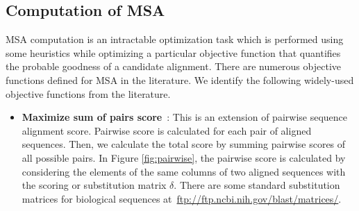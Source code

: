 

\subsection{Computation of MSA}
MSA computation is an intractable optimization task which is performed using some heuristics while optimizing a particular objective function that quantifies the probable goodness of a candidate alignment. There are numerous objective functions defined for MSA in the literature. We identify the following widely-used objective functions from the literature.

\begin{itemize}
	
	\item \textbf{Maximize sum of pairs score}~\cite{seeluangsawat2005multiple, da2010alineaga}:  
	This is an extension of pairwise sequence alignment score. Pairwise score is calculated for each pair of aligned sequences. Then, we calculate the total score by summing pairwise scores of all possible pairs. In Figure \ref{fig:pairwise}, the pairwise score is calculated by considering the elements of the same columns of two aligned sequences with the scoring or substitution matrix $\delta$. There are some standard substitution matrices for biological sequences at~\url{ftp://ftp.ncbi.nih.gov/blast/matrices/}.
	

\end{itemize}
